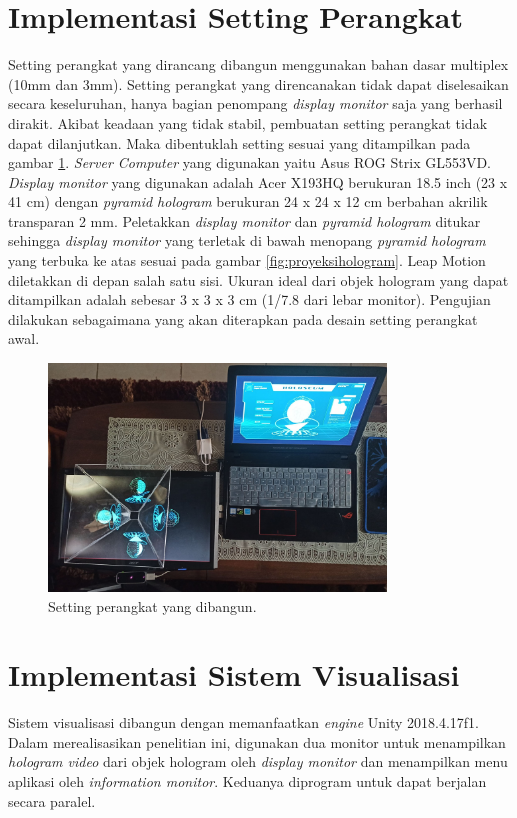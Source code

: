 \section{Implementasi Setting Perangkat}
\vspace{1ex}
	Setting perangkat yang dirancang dibangun menggunakan bahan dasar multiplex (10mm dan 3mm). Setting perangkat yang direncanakan tidak dapat diselesaikan secara keseluruhan, hanya bagian penompang \textit{display monitor} saja yang berhasil dirakit. Akibat keadaan yang tidak stabil, pembuatan setting perangkat tidak dapat dilanjutkan. Maka dibentuklah setting sesuai yang ditampilkan pada gambar \ref{fig:foto_alat}. \textit{Server Computer} yang digunakan yaitu Asus ROG Strix GL553VD. \textit{Display monitor} yang digunakan adalah Acer X193HQ berukuran 18.5 inch (23 x 41 cm) dengan \textit{pyramid hologram} berukuran 24 x 24 x 12 cm berbahan akrilik transparan 2 mm. Peletakkan \textit{display monitor} dan \textit{pyramid hologram} ditukar sehingga \textit{display monitor} yang terletak di bawah menopang \textit{pyramid hologram} yang terbuka ke atas sesuai pada gambar \ref{fig:proyeksihologram}. Leap Motion diletakkan di depan salah satu sisi. Ukuran ideal dari objek hologram yang dapat ditampilkan adalah sebesar 3 x 3 x 3 cm (1/7.8 dari lebar monitor). Pengujian dilakukan sebagaimana yang akan diterapkan pada desain setting perangkat awal. 
	\begin{figure} [H]
		\includegraphics[width=0.8\textwidth]{img/bab3/foto_alat.jpg}
		\caption{Setting perangkat yang dibangun.}
		\label{fig:foto_alat}
	\end{figure}
\vspace{2ex}

\section{Implementasi Sistem Visualisasi} \label{section:visualisasi}
\vspace{1ex}
	Sistem visualisasi dibangun dengan memanfaatkan \textit{engine} Unity 2018.4.17f1. Dalam merealisasikan penelitian ini, digunakan dua monitor untuk menampilkan \textit{hologram video} dari objek hologram oleh \textit{display monitor} dan menampilkan menu aplikasi oleh \textit{information monitor}. Keduanya diprogram untuk dapat berjalan secara paralel.
\vspace{1.5ex}
	
